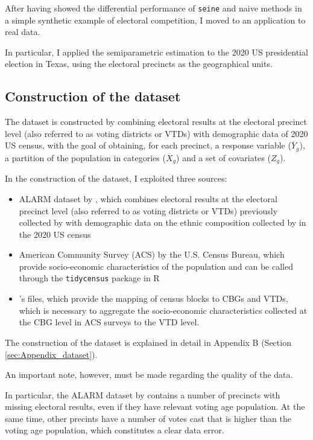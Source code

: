 After having showed the differential performance of \texttt{seine} and naive methods in a simple synthetic example of electoral competition, I moved to an application to real data.

In particular, I applied the semiparametric estimation to the 2020 US presidential election in Texas, using the electoral precincts as the geographical units.


\subsection{Construction of the dataset}

The dataset is constructed by combining electoral results at the electoral precinct level (also referred to as voting districts or VTDs) with demographic data of 2020 US census, with the goal of obtaining, for each precinct, a response variable ($\overline{Y}_g$), a partition of the population in categories ($\overline{X}_g$) and a set of covariates ($Z_g$).

In the construction of the dataset, I exploited three sources:
\begin{itemize}
    \item ALARM dataset by \citet{t._kenny2021}, which combines electoral results at the electoral precinct level (also referred to as voting districts or VTDs) previously collected by \citet{vest2020precinct} with demographic data on the ethnic composition collected by \citet{uscensus2020} in the 2020 US census
    \item American Community Survey (ACS) by the U.S. Census Bureau, which provide socio-economic characteristics of the population and can be called through the \texttt{tidycensus} package in R \citep{tidycensus}
    \item \citet{census2021baf}'s files, which provide the mapping of census blocks to CBGs and VTDs, which is necessary to aggregate the socio-economic characteristics collected at the CBG level in ACS surveys to the VTD level.
\end{itemize}


The construction of the dataset is explained in detail in Appendix B (Section \ref{sec:Appendix_dataset}).

An important note, however, must be made regarding the quality of the data.

In particular, the ALARM dataset by \citet{t._kenny2021} contains a number of precincts with missing electoral results, even if they have relevant voting age population.
At the same time, other precints have a number of votes cast that is higher than the voting age population, which constitutes a clear data error.

